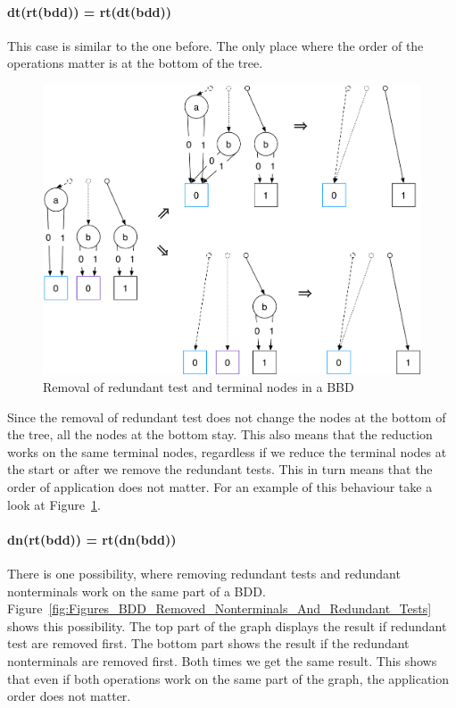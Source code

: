 \documentclass[a4paper, 11pt]{article}
\begin{document}
\paragraph{dt(rt(bdd)) = rt(dt(bdd))}

This case is similar to the one before. The only place where the order of the operations matter is at the bottom of the tree.

\begin{figure}[h]
  \centering
    \includegraphics[width=.75\textwidth]{Figures/BDD Removed Terminals And Redundant Tests.pdf}
  \caption{Removal of redundant test and terminal nodes in a BBD}
  \label{fig:Figures_BDD_Removed_Terminals_And_Redundant_Tests}
\end{figure}

Since the removal of redundant test does not change the nodes at the bottom of the tree, all the nodes at the bottom stay. This also means that the reduction works on the same terminal nodes, regardless if we reduce the terminal nodes at the start or after we remove the redundant tests. This in turn means that the order of application does not matter. For an example of this behaviour take a look at Figure~\ref{fig:Figures_BDD_Removed_Terminals_And_Redundant_Tests}.

\paragraph{dn(rt(bdd)) = rt(dn(bdd))}

There is one possibility, where removing redundant tests and redundant nonterminals work on the same part of a BDD. Figure~\ref{fig:Figures_BDD_Removed_Nonterminals_And_Redundant_Tests} shows this possibility. The top part of the graph displays the result if redundant test are removed first. The bottom part shows the result if the redundant nonterminals are removed first. Both times we get the same result. This shows that even if both operations work on the same part of the graph, the application order does not matter.
\end{document}
